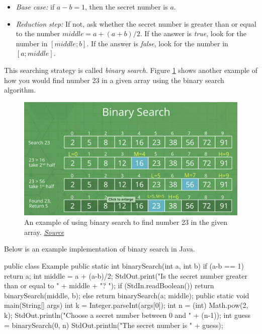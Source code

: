 \begin{itemize}
\item \textit{Base case:} if $a-b = 1$, then the secret number is $a$.
\item \textit{Reduction step:} If not, ask whether the secret number is greater than or equal to the number $middle = a + (a+b)/2$. If the answer is \textit{true}, look for the number in  $[middle; b]$. If the answer is \textit{false}, look for the number in $[a; middle]$.
\end{itemize}

This searching strategy is called \textit{binary search}. Figure \ref{fig:binary} shows another example of how you would find number 23 in a given array using the binary search algorithm.

\begin{figure}
    \centering
    \includegraphics[width=\textwidth]{images/binary.png}
    \caption{An example of using binary search to find number 23 in the given array. \href{https://www.geeksforgeeks.org/binary-search/}{\textit{Source}}}
    \label{fig:binary}
\end{figure}


Below is an example implementation of binary search in Java.

\begin{code}
public class Example
{
    public static int binarySearch(int a, int b)
	{
	if (a-b == 1) return a;
 	int middle = a + (a-b)/2;
	StdOut.print("Is the secret number greater than or equal to " + middle + "? ");
	if (StdIn.readBoolean())
		return binarySearch(middle, b);
	else
		return binarySearch(a; middle);
	}
	public static void main(String[] args)
{
int k = Integer.parseInt(args[0]);
int n = (int) Math.pow(2, k);
StdOut.println("Choose a secret number between 0 and " + (n-1));
int guess = binarySearch(0, n)
StdOut.println("The secret number is " + guess);
}
}
\end{code}
 
